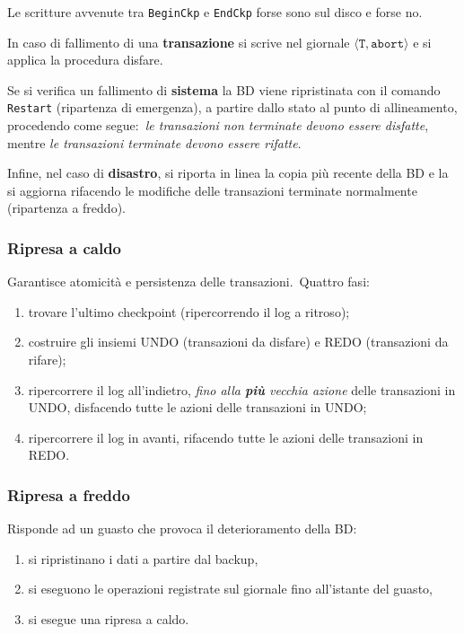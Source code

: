 \begin{flushleft}
	Le scritture avvenute tra \texttt{BeginCkp} e \texttt{EndCkp} forse sono sul disco e forse no.
\end{flushleft}

\noindent In caso di fallimento di una \textbf{transazione} si scrive nel giornale $\langle\mathtt{T, abort}\rangle$ e si applica la procedura disfare.\

Se si verifica un fallimento di \textbf{sistema} la BD viene ripristinata con il comando \texttt{Restart} (ripartenza di emergenza), a partire dallo stato al punto di allineamento, procedendo come segue:\ \textit{le transazioni non terminate devono essere disfatte}, mentre \textit{le transazioni terminate devono essere rifatte}.\

Infine, nel caso di \textbf{disastro}, si riporta in linea la copia più recente della BD e la si aggiorna rifacendo le modifiche delle transazioni terminate normalmente (ripartenza a freddo).\

\subsubsection{Ripresa a caldo}
Garantisce atomicità e persistenza delle transazioni.\
Quattro fasi:
\begin{enumerate}
	\item trovare l'ultimo checkpoint (ripercorrendo il log a ritroso);
	\item costruire gli insiemi UNDO (transazioni da disfare) e REDO (transazioni da rifare);
	\item ripercorrere il log all'indietro, \textit{fino alla \textbf{più} vecchia azione} delle transazioni in UNDO, disfacendo tutte le azioni delle transazioni in UNDO;
	\item ripercorrere il log in avanti, rifacendo tutte le azioni delle transazioni in REDO.
\end{enumerate}

\subsubsection{Ripresa a freddo}
Risponde ad un guasto che provoca il deterioramento della BD:
\begin{enumerate}
	\item si ripristinano i dati a partire dal backup,
	\item si eseguono le operazioni registrate sul giornale fino all'istante del guasto,
	\item si esegue una ripresa a caldo.
\end{enumerate}

